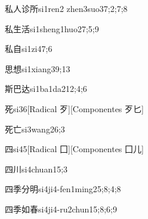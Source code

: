 \begin{verbete}{私人诊所}{si1ren2 zhen3suo3}{7;2;7;8}
\end{verbete}

\begin{verbete}{私生活}{si1sheng1huo2}{7;5;9}
\end{verbete}

\begin{verbete}{私自}{si1zi4}{7;6}
\end{verbete}

\begin{verbete}{思想}{si1xiang3}{9;13}
\end{verbete}

\begin{verbete}{斯巴达}{si1ba1da2}{12;4;6}
\end{verbete}

\begin{verbete}{死}{si3}{6}[Radical 歹][Componentes 歹匕]
\end{verbete}

\begin{verbete}{死亡}{si3wang2}{6;3}
\end{verbete}

\begin{verbete}{四}{si4}{5}[Radical 囗][Componentes 囗儿]
\end{verbete}

\begin{verbete}{四川}{si4chuan1}{5;3}
\end{verbete}

\begin{verbete}{四季分明}{si4ji4-fen1ming2}{5;8;4;8}
\end{verbete}

\begin{verbete}{四季如春}{si4ji4-ru2chun1}{5;8;6;9}
\end{verbete}

